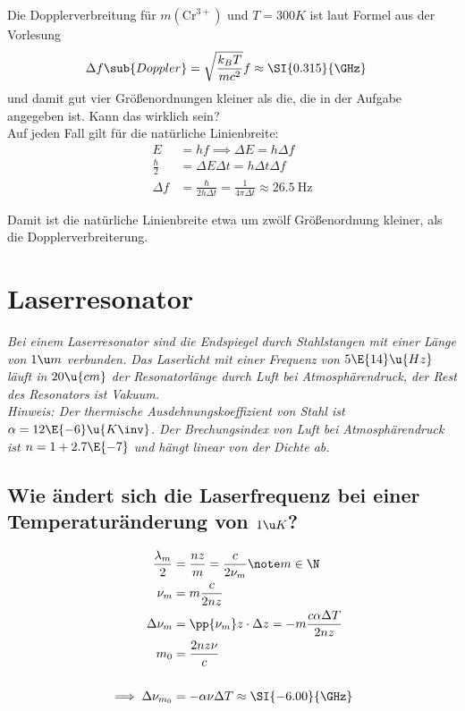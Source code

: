 \documentclass[ex]{exercise_4.1}
\begin{document}
\dottedlinett

Die Dopplerverbreitung für \(m(\mathrm{Cr}^{3+})\) und \(T=300K\) ist laut Formel aus der Vorlesung
\begin{align*}
    \Delta f\sub{Doppler}&= \sqrt{\frac{k_B T}{mc^2}} f 
    \approx  \SI{0.315}{\GHz}
\end{align*}
und damit gut vier Größenordnungen kleiner als die, die in der Aufgabe angegeben ist. Kann das wirklich sein?\\

Auf jeden Fall gilt für die natürliche Linienbreite:
\begin{align*}
    E &= hf \implies \Delta E = h\Delta f\\
    \frac\hbar2 &= \Delta E \Delta t 
    = h\Delta t \Delta f\\
    \Delta f &= \frac{\hbar}{2h \Delta t} 
    = \frac{1}{4\pi \Delta t}
    \approx \SI{26.5}{\Hz}
\end{align*}

Damit ist die natürliche Linienbreite etwa um zwölf Größenordnung kleiner, als die Dopplerverbreiterung.

\section{Laserresonator}
{\it Bei einem Laserresonator sind die Endspiegel durch Stahlstangen mit einer Länge von \(1\u m\) verbunden. Das Laserlicht mit einer Frequenz von \(5\E{14}\u{Hz}\) läuft in \(20\u{cm}\) der Resonatorlänge durch Luft bei Atmosphärendruck, der Rest des Resonators ist Vakuum.\\
Hinweis: Der thermische Ausdehnungskoeffizient von Stahl ist \(\alpha=12\E{-6}\u {K\inv}\). Der Brechungsindex von Luft bei Atmosphärendruck ist \(n=1+2.7\E{-7}\) und hängt linear von der Dichte ab.}

\subsection{Wie ändert sich die Laserfrequenz bei einer Temperaturänderung von \(1\u K\)?}

\dottedlinete

\begin{align*}
    \frac{\lambda_m}{2} &= \frac {nz}m=\frac{c}{2\nu_m}\note m\in\N\\
    \nu_m &= m \frac{c}{2nz}\\
    \Delta \nu_m &= \pp{\nu_m}z \cdot \Delta z 
    = -m \frac{c\alpha \Delta T}{2nz}\\
    m_0 &= \frac{2n z \nu}{c}\\
    \\
    \implies \Delta \nu_{m_0} &= -\alpha \nu \Delta T
    \approx\SI{-6.00}{\GHz}
\end{align*}
\end{document}
